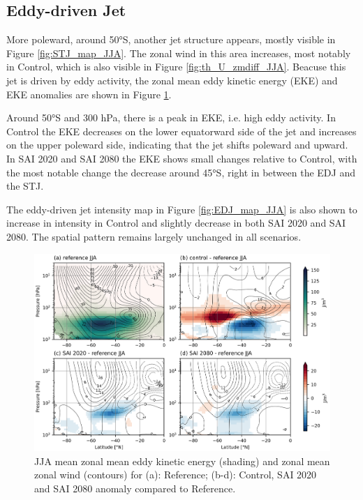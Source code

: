 \subsection{Eddy-driven Jet}
More poleward, around 50°S, another jet structure appears, mostly visible in Figure \ref{fig:STJ_map_JJA}. The zonal wind in this area increases, most notably in Control, which is also visible in Figure \ref{fig:th_U_zmdiff_JJA}. Beacuse this jet is driven by eddy activity, the zonal mean eddy kinetic energy (EKE) and EKE anomalies are shown in Figure \ref{fig:EKE_U_zmdiff_JJA}.

Around 50°S and 300 hPa, there is a peak in EKE, i.e. high eddy activity. In Control the EKE decreases on the lower equatorward side of the jet and increases on the upper poleward side, indicating that the jet shifts poleward and upward. In SAI 2020 and SAI 2080 the EKE shows small changes relative to Control, with the most notable change the decrease around 45°S, right in between the EDJ and the STJ. 

The eddy-driven jet intensity map in Figure \ref{fig:EDJ_map_JJA} is also shown to increase in intensity in Control and slightly decrease in both SAI 2020 and SAI 2080. The spatial pattern remains largely unchanged in all scenarios. 

\begin{figure}[H]
	\centering
	\includegraphics[width=0.95\linewidth]{images/EKE_U_zmdiff_JJA.png}
	\caption{JJA mean zonal mean eddy kinetic energy (shading) and zonal mean zonal wind (contours) for (a): Reference; (b-d): Control, SAI 2020 and SAI 2080 anomaly compared to Reference.}
	\label{fig:EKE_U_zmdiff_JJA}
\end{figure}

